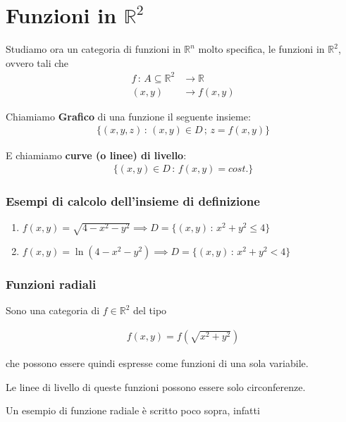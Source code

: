 \section{Funzioni in $\mathbb{R}^2$}

Studiamo ora un categoria di funzioni in $\mathbb{R}^n$ molto specifica, le funzioni in $\mathbb{R}^2$, ovvero tali che
\begin{align}
f \, : \, A\subseteq \mathbb{R}^2 {}&\longrightarrow \mathbb{R} \\
(x,y) &\longrightarrow f(x,y) \nonumber
\end{align}

Chiamiamo \textbf{Grafico} di una funzione il seguente insieme:
\begin{align}
\{(x,y,z) \, : \, (x,y)\in D \, ; \, z=f(x,y)\}
\end{align}

E chiamiamo \textbf{curve (o linee) di livello}:
\begin{align}
\{ (x,y) \in D \, : \, f(x,y)=cost. \}
\end{align}

\subsubsection{Esempi di calcolo dell'insieme di definizione}

\begin{enumerate}
	\item $f(x,y)=\sqrt{4-x^2-y^2} \implies D= \{ (x,y) \, : \, x^2 + y^2 \leq 4 \}$
	
	\item $f(x,y)=\ln(4-x^2-y^2) \implies D= \{ (x,y) \, : \, x^2 + y^2 < 4 \}$
\end{enumerate}

\subsubsection{Funzioni radiali}

Sono una categoria di $f\in \mathbb{R}^2$ del tipo

\begin{align}
f(x,y)=f(\sqrt{x^2 + y^2})
\end{align}

che possono essere quindi espresse come funzioni di una sola variabile.

Le linee di livello di queste funzioni possono essere solo circonferenze.

Un esempio di funzione radiale è scritto poco sopra, infatti

